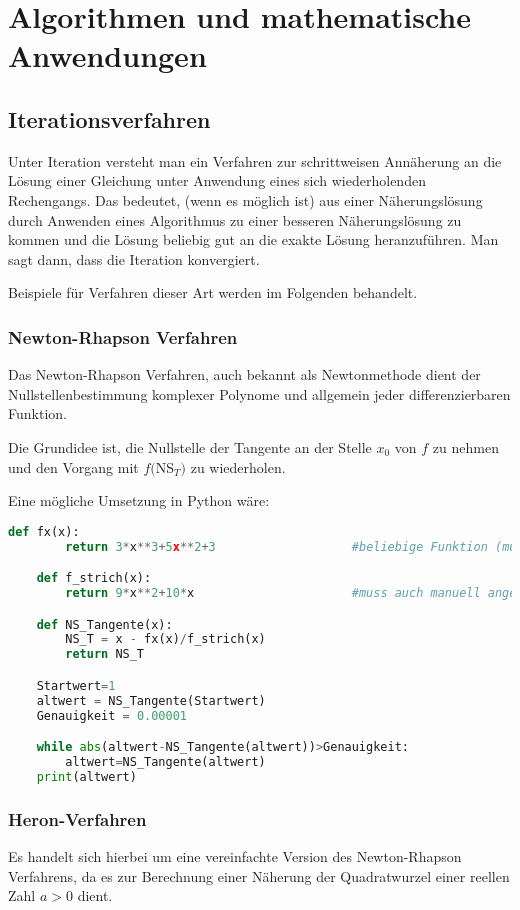 \documentclass[main.tex]{subfiles}
\begin{document}
\section{Algorithmen und mathematische Anwendungen}
\subsection{Iterationsverfahren}

Unter Iteration versteht man ein Verfahren zur schrittweisen Annäherung an die Lösung einer Gleichung unter Anwendung eines sich wiederholenden Rechengangs. Das bedeutet, (wenn es möglich ist) aus einer Näherungslösung durch Anwenden eines Algorithmus zu einer besseren Näherungslösung zu kommen und die Lösung beliebig gut an die exakte Lösung heranzuführen. Man sagt dann, dass die Iteration konvergiert.

Beispiele für Verfahren dieser Art werden im Folgenden behandelt.


\subsubsection{Newton-Rhapson Verfahren}
Das Newton-Rhapson Verfahren, auch bekannt als Newtonmethode dient der Nullstellenbestimmung komplexer Polynome und allgemein jeder differenzierbaren Funktion.

Die Grundidee ist, die Nullstelle der Tangente an der Stelle $x_0$ von $f$ zu nehmen und den Vorgang mit $f($NS$_T)$ zu wiederholen.

Eine mögliche Umsetzung in Python wäre:

\begin{lstlisting}[language=Python]
	def fx(x):
		return 3*x**3+5x**2+3					#beliebige Funktion (muss angegeben werden)

	def f_strich(x):
		return 9*x**2+10*x						#muss auch manuell angegeben werden

	def NS_Tangente(x):
		NS_T = x - fx(x)/f_strich(x)
		return NS_T

	Startwert=1
	altwert = NS_Tangente(Startwert)
	Genauigkeit = 0.00001

	while abs(altwert-NS_Tangente(altwert))>Genauigkeit:
		altwert=NS_Tangente(altwert)
	print(altwert)

\end{lstlisting}

\subsubsection{Heron-Verfahren}
Es handelt sich hierbei um eine vereinfachte Version des Newton-Rhapson Verfahrens, da es zur Berechnung einer Näherung der Quadratwurzel einer reellen Zahl $a>0$ dient.
\end{document}
